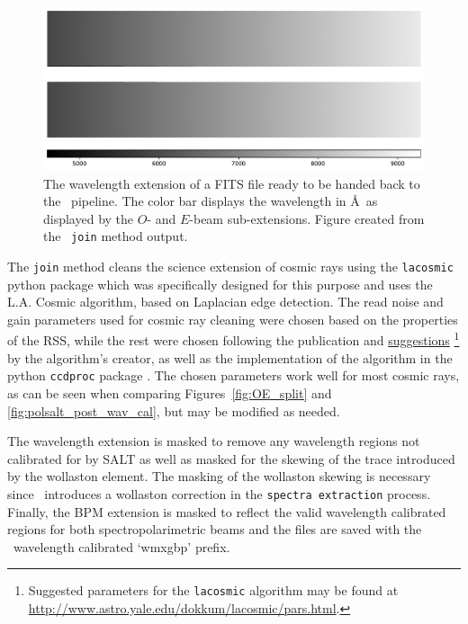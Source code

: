 \begin{figure}[t]
    \centering
    \includegraphics[width = 1.0\textwidth]{figures/3_pol_wav_ext.pdf}
    \caption{The wavelength extension of a \gls{FITS} file ready to be handed back to the \polsalt\ pipeline. The color bar displays the wavelength in \AA\ as displayed by the $O$- and $E$-beam sub-extensions. Figure created from the \stops\ \texttt{join} method output.}
    \label{fig:pol_wav_ext}
\end{figure}

The \texttt{join} method cleans the science extension of cosmic rays using the \texttt{lacosmic} python package which was specifically designed for this purpose and uses the L.A. Cosmic algorithm, based on Laplacian edge detection. The read noise and gain parameters used for cosmic ray cleaning were chosen based on the properties of the \gls{RSS}, while the rest were chosen following the publication and \href{http://www.astro.yale.edu/dokkum/lacosmic/pars.html}{suggestions}%
\footnote{Suggested parameters for the \texttt{lacosmic} algorithm may be found at \url{http://www.astro.yale.edu/dokkum/lacosmic/pars.html}.}
by the algorithm's creator, as well as the implementation of the algorithm in the python \texttt{ccdproc} package \citep{lacosmic,astroscrappy}. The chosen parameters work well for most cosmic rays, as can be seen when comparing Figures~\ref{fig:OE_split} and \ref{fig:polsalt_post_wav_cal}, but may be modified as needed.

The wavelength extension is masked to remove any wavelength regions not calibrated for by \gls{SALT} as well as masked for the skewing of the trace introduced by the wollaston element. The masking of the wollaston skewing is necessary since \polsalt\ introduces a wollaston correction in the \texttt{spectra extraction} process. Finally, the \gls{BPM} extension is masked to reflect the valid wavelength calibrated regions for both spectropolarimetric beams and the files are saved with the \polsalt\ wavelength calibrated `wmxgbp' prefix.

